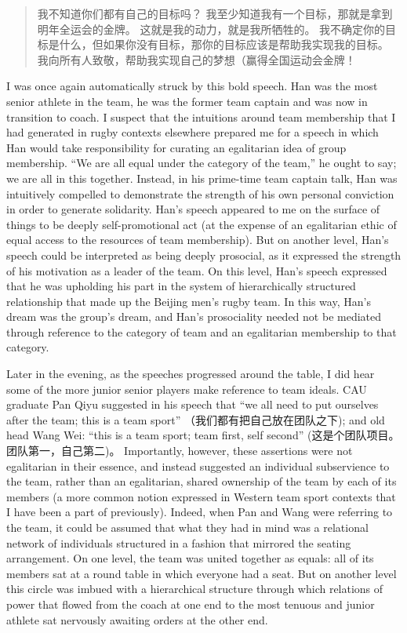 \begin{CJK}{UTF8}{gbsn}
  \begin{quotation}
      我不知道你们都有自己的目标吗？ 我至少知道我有一个目标，那就是拿到明年全运会的金牌。 这就是我的动力，就是我所牺牲的。 我不确定你的目标是什么，但如果你没有目标，那你的目标应该是帮助我实现我的目标。 我向所有人致敬，帮助我实现自己的梦想（赢得全国运动会金牌！
  \end{quotation}

I was once again automatically struck by this bold speech.  Han was the most senior athlete in the team, he was the former team captain and was now in transition to coach.  I suspect that the intuitions around team membership that I had generated in rugby contexts elsewhere prepared me for a speech in which Han would take responsibility for curating an egalitarian idea of group membership.  ``We are all equal under the category of the team,'' he ought to say; we are all in this together.   Instead, in his prime-time team captain talk, Han was intuitively compelled to demonstrate the strength of his own personal conviction in order to generate solidarity. Han's speech appeared to me on the surface of things to be deeply self-promotional act (at the expense of an egalitarian ethic of equal access to the resources of team membership). But on another level, Han's speech could be interpreted as being deeply prosocial, as it expressed the strength of his motivation as a leader of the team. On this level, Han's speech expressed that he was upholding his part in the system of hierarchically structured relationship that made up the Beijing men's rugby team.  In this way, Han's dream was the group's dream, and Han's prosociality needed not be mediated through reference to the category of team and an egalitarian membership to that category.

Later in the evening, as the speeches progressed around the table, I did hear some of the more junior senior players make reference to team ideals.   CAU graduate Pan Qiyu suggested in his speech that ``we all need to put ourselves after the team; this is a team sport'' （我们都有把自己放在团队之下); and old head Wang Wei: ``this is a team sport; team first, self second'' (这是个团队项目。团队第一，自己第二)。 Importantly, however, these assertions were not egalitarian in their essence, and instead suggested an individual subservience to the team, rather than an egalitarian, shared ownership of the team by each of its members (a more common notion expressed in Western team sport contexts that I have been a part of previously).  Indeed, when Pan and Wang were referring to the team, it could be assumed that what they had in mind was a relational network of individuals structured in a fashion that mirrored the seating arrangement. On one level, the team was united together as equals: all of its members sat at a round table in which everyone had a seat. But on another level this circle was imbued with a hierarchical structure through which relations of power that flowed from the coach at one end to the most tenuous and junior athlete sat nervously awaiting orders at the other end.


\end{CJK}
